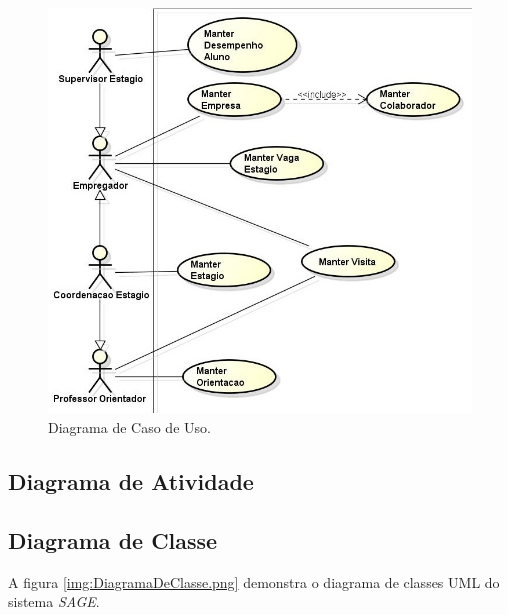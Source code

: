 \begin{figure}[H]
 \centering \includegraphics[scale=0.5]{imagens/DiagramaDeCasoDeUso.png}
 \caption{Diagrama de Caso de Uso.}
 \label{img:DiagramaDeCasoDeUso.png}
\end{figure}

\subsection{Diagrama de Atividade}
\label{sec:diagramaFluxo}

\subsection{Diagrama de Classe}
\label{sec:diagramaClasse}

A figura \ref{img:DiagramaDeClasse.png} demonstra o diagrama de classes UML do
sistema {\it SAGE}.

